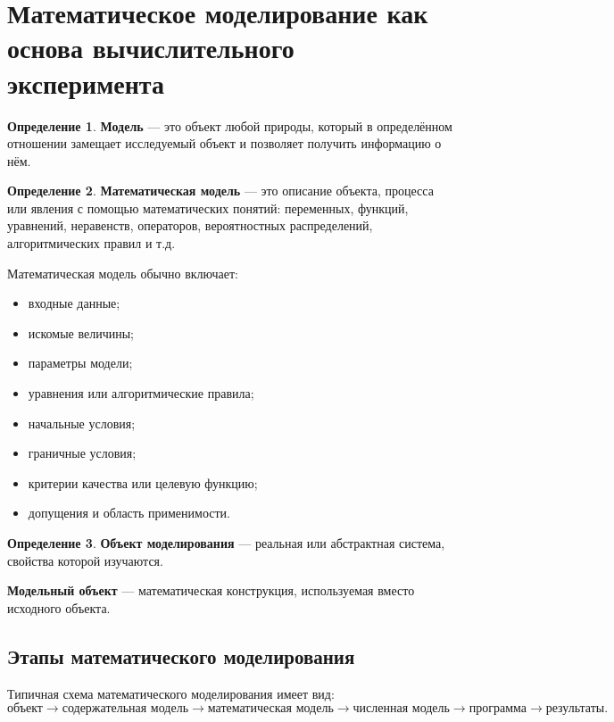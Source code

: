 \documentclass[12pt,a4paper]{article}
\theoremstyle{definition}
\newtheorem{definition}{Определение}
\theoremstyle{plain}
\begin{document}
\section{Математическое моделирование как основа вычислительного эксперимента}

\begin{definition}
\textbf{Модель} --- это объект любой природы, который в определённом отношении замещает исследуемый объект и позволяет получить информацию о нём.
\end{definition}

\begin{definition}
\textbf{Математическая модель} --- это описание объекта, процесса или явления с помощью математических понятий: переменных, функций, уравнений, неравенств, операторов, вероятностных распределений, алгоритмических правил и т.д.
\end{definition}

Математическая модель обычно включает:
\begin{itemize}
    \item входные данные;
    \item искомые величины;
    \item параметры модели;
    \item уравнения или алгоритмические правила;
    \item начальные условия;
    \item граничные условия;
    \item критерии качества или целевую функцию;
    \item допущения и область применимости.
\end{itemize}

\begin{definition}
\textbf{Объект моделирования} --- реальная или абстрактная система, свойства которой изучаются.

\textbf{Модельный объект} --- математическая конструкция, используемая вместо исходного объекта.
\end{definition}

\subsection{Этапы математического моделирования}

Типичная схема математического моделирования имеет вид:
\[
\text{объект} \longrightarrow
\text{содержательная модель} \longrightarrow
\text{математическая модель} \longrightarrow
\text{численная модель} \longrightarrow
\text{программа} \longrightarrow
\text{результаты}.
\]
\end{document}
